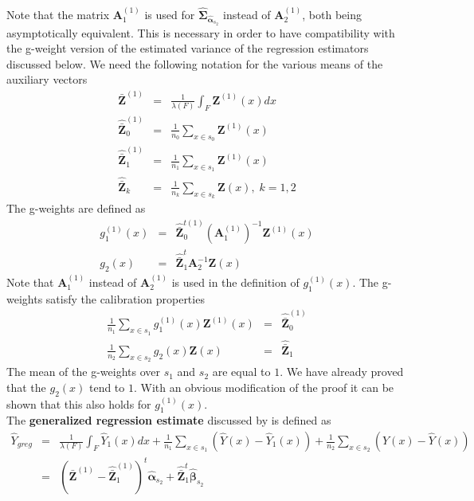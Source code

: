 \documentclass[a4paper,12pt,leqno, titlepage]{article}
\begin{document}
Note that the  matrix $\pmb{A}^{(1)}_1$ is used for $\hat{\pmb{\Sigma}}_{\hat{\pmb{\alpha}}_{s_2}}$ instead of $\pmb{A}^{(1)}_2$, both being asymptotically equivalent. This is necessary in order to have compatibility with the g-weight version of the estimated variance of the regression estimators discussed below. We need the following notation for the various means of the auxiliary vectors
\begin{eqnarray}\label{meanvalues}
\bar{\pmb{Z}}^{(1)} &=& \frac{1}{\lambda(F)}\int_F \pmb{Z}^{(1)}(x)dx \nonumber \\
\hat{\bar{\pmb{Z}}}^{(1)}_0 &=& \frac{1}{n_0}\sum_{x\in{s_0}}\pmb{Z}^{(1)}(x) \nonumber \\
\hat{\bar{\pmb{Z}}}^{(1)}_1 &=& \frac{1}{n_1}\sum_{x\in{s}_1}\pmb{Z}^{(1)}(x)  \nonumber \\
\hat{\bar{\pmb{Z}}}_k &=& \frac{1}{n_k}\sum_{x\in{s}_k}\pmb{Z}(x),\;k=1,2
\end{eqnarray}
The g-weights are defined as
\begin{eqnarray}\label{gweight5}
g^{(1)}_1(x)&=&\hat{\bar{\pmb{Z}}}_0^{t(1)}(\pmb{A}^{(1)}_1)^{-1}\pmb{Z}^{(1)}(x)\nonumber \\
g_2(x) &=& \hat{\bar{\pmb{Z}}}^t_{1}\pmb{A}^{-1}_{2}\pmb{Z}(x)
\end{eqnarray}
Note that $\pmb{A}^{(1)}_1$ instead of $\pmb{A}^{(1)}_2$ is used in the definition of $g^{(1)}_1(x)$.
 The g-weights satisfy the calibration properties
\begin{eqnarray}\label{gweight6}
\frac{1}{n_1}\sum_{x\in{s_1}}g^{(1)}_1(x)\pmb{Z}^{(1)}(x)&=&\hat{\bar{\pmb{Z}}}^{(1)}_0 \nonumber \\
\frac{1}{n_2}\sum_{x\in{s_2}}g_2(x)\pmb{Z}(x)&=&\hat{\bar{\pmb{Z}}}_{1}
\end{eqnarray}
The mean of the g-weights over $s_1$ and $s_2$ are equal to $1$. We have already proved that the $g_2(x)$ tend to $1$. With an obvious modification of the proof it can be shown that this also holds for $g^{(1)}_1(x)$.\\
The \textbf{generalized regression estimate} discussed by \cite{mandallaz4} is defined as
\begin{eqnarray}\label{ygreg1}
\hat{Y}_{greg} &=& \frac{1}{\lambda(F)}\int_F \hat{Y}_1(x)dx
+\frac{1}{n_1}\sum_{x\in{s}_1}(\hat{Y}(x)-\hat{Y}_1(x))
+ \frac{1}{n_2}\sum_{x\in{s}_2}(Y(x)-\hat{Y}(x)) \nonumber \\
&=& (\bar{\pmb{Z}}^{(1)}-\hat{\bar{\pmb{Z}}}^{(1)}_1)^t\hat{\pmb{\alpha}}_{s_2} +
\hat{\bar{\pmb{Z}}}^t_1\hat{\pmb{\beta}}_{s_2}
\end{eqnarray}
\end{document}
